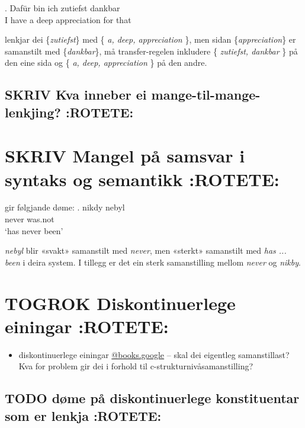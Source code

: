 \documentclass[11pt,a4paper,oneside,draft]{book}
\begin{document}
\ex. Dafür bin ich zutiefst dankbar \\
     I have a deep appreciation for that

lenkjar dei \{\emph{zutiefst}\} med \{ \emph{a, deep, appreciation} \}, men
sidan \{\emph{appreciation}\} er samanstilt med \{\emph{dankbar}\}, må
transfer-regelen inkludere \{ \emph{zutiefst, dankbar} \} på den eine sida
og \{ \emph{a, deep, appreciation} \} på den andre.


\subsection{\textbf{SKRIV} Kva inneber ei mange-til-mange-lenkjing? \textbf{:ROTETE:}}
\label{sec-3.8.1}


\section{\textbf{SKRIV} Mangel på samsvar i syntaks og semantikk \textbf{:ROTETE:}}
\label{sec-3.9}

\cite[s.~5]{kruijffkorbayova2006agc} gir følgjande døme: 
\ex.  nikdy nebyl \\
      never was.not\\
      `has never been'

\emph{nebyl} blir «svakt» samanstilt med \emph{never}, men «sterkt» samanstilt med
\emph{has ... been} i deira system. I tillegg er det ein sterk samanstilling
mellom \emph{never} og \emph{nikby}.


\section{\textbf{TOGROK} Diskontinuerlege einingar \textbf{:ROTETE:}}
\label{sec-3.10}

\begin{itemize}
\item diskontinuerlege einingar \cite[s.~4]{cheung2002scg}
     \href{http://scholar.google.no/scholar.bib%3Fhl%3Dno&lr%3D&ie%3DUTF-8&q%3Dinfo:Qh_MRSftNZgJ:scholar.google.com/&output%3Dcitation&oe%3DMACINTOSH&oi%3Dcitation}{@books.google} -- skal dei eigentleg samanstillast? Kva for problem
     gir dei i forhold til c-strukturnivåsamanstilling?
\end{itemize}
\subsection{\textbf{TODO} døme på diskontinuerlege konstituentar som er lenkja \textbf{:ROTETE:}}
\label{sec-3.10.1}
\end{document}
